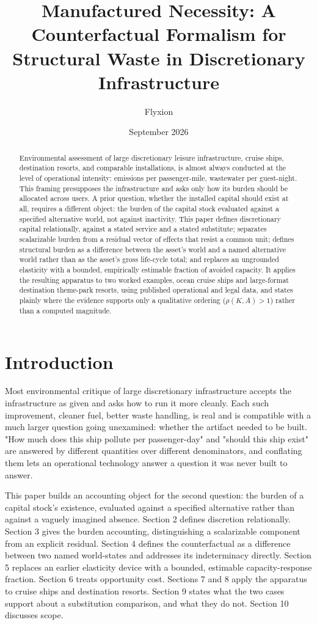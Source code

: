 \documentclass[11pt]{article}
\title{Manufactured Necessity: A Counterfactual Formalism for Structural Waste in Discretionary Infrastructure}
\author{Flyxion}
\affil{Independent Researcher}
\date{September 2026}
\begin{document}
\maketitle

\begin{abstract}
Environmental assessment of large discretionary leisure infrastructure, cruise ships, destination resorts, and comparable installations, is almost always conducted at the level of operational intensity: emissions per passenger-mile, wastewater per guest-night. This framing presupposes the infrastructure and asks only how its burden should be allocated across users. A prior question, whether the installed capital should exist at all, requires a different object: the burden of the capital stock evaluated against a specified alternative world, not against inactivity. This paper defines discretionary capital relationally, against a stated service and a stated substitute; separates scalarizable burden from a residual vector of effects that resist a common unit; defines structural burden as a difference between the asset's world and a named alternative world rather than as the asset's gross life-cycle total; and replaces an ungrounded elasticity with a bounded, empirically estimable fraction of avoided capacity. It applies the resulting apparatus to two worked examples, ocean cruise ships and large-format destination theme-park resorts, using published operational and legal data, and states plainly where the evidence supports only a qualitative ordering ($\rho(K,A) > 1$) rather than a computed magnitude.
\end{abstract}

\section{Introduction}

Most environmental critique of large discretionary infrastructure accepts the infrastructure as given and asks how to run it more cleanly. Each such improvement, cleaner fuel, better waste handling, is real and is compatible with a much larger question going unexamined: whether the artifact needed to be built. "How much does this ship pollute per passenger-day" and "should this ship exist" are answered by different quantities over different denominators, and conflating them lets an operational technology answer a question it was never built to answer.

This paper builds an accounting object for the second question: the burden of a capital stock's existence, evaluated against a specified alternative rather than against a vaguely imagined absence. Section 2 defines discretion relationally. Section 3 gives the burden accounting, distinguishing a scalarizable component from an explicit residual. Section 4 defines the counterfactual as a difference between two named world-states and addresses its indeterminacy directly. Section 5 replaces an earlier elasticity device with a bounded, estimable capacity-response fraction. Section 6 treats opportunity cost. Sections 7 and 8 apply the apparatus to cruise ships and destination resorts. Section 9 states what the two cases support about a substitution comparison, and what they do not. Section 10 discusses scope.
\end{document}
